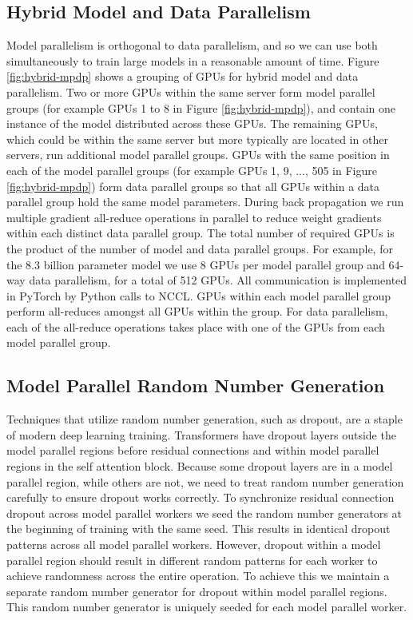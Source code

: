 \documentclass{article}
\begin{document}
\subsection{Hybrid Model and Data Parallelism}
Model parallelism is orthogonal to data parallelism, and so we can use both simultaneously to train large models in a reasonable amount of time. Figure \ref{fig:hybrid-mpdp} shows a grouping of GPUs for hybrid model and data parallelism. Two or more GPUs within the same server form model parallel groups (for example GPUs 1 to 8 in Figure \ref{fig:hybrid-mpdp}), and contain one instance of the model distributed across these GPUs.  The remaining GPUs, which could be within the same server but more typically are located in other servers, run additional model parallel groups. GPUs with the same position in each of the model parallel groups (for example GPUs 1, 9, ..., 505 in Figure \ref{fig:hybrid-mpdp}) form data parallel groups so that all GPUs within a data parallel group hold the same model parameters. During back propagation we run multiple gradient all-reduce operations in parallel to reduce weight gradients within each distinct data parallel group. The total number of required GPUs is the product of the number of model and data parallel groups. For example, for the 8.3 billion parameter model we use 8 GPUs per model parallel group and 64-way data parallelism, for a total of 512 GPUs.  All communication is implemented in PyTorch by Python calls to NCCL.  GPUs within each model parallel group perform all-reduces amongst all GPUs within the group.  For data parallelism, each of the all-reduce operations takes place with one of the GPUs from each model parallel group.

\subsection{Model Parallel Random Number Generation}
Techniques that utilize random number generation, such as dropout, are a staple of modern deep learning training. Transformers have dropout layers outside the model parallel regions before residual connections and within model parallel regions in the self attention block. Because some dropout layers are in a model parallel region, while others are not, we need to treat random number generation carefully to ensure dropout works correctly. To synchronize residual connection dropout across model parallel workers we seed the random number generators at the beginning of training with the same seed. This results in identical dropout patterns across all model parallel workers. However, dropout within a model parallel region should result in different random patterns for each worker to achieve randomness across the entire operation. To achieve this we maintain a separate random number generator for dropout within model parallel regions. This random number generator is uniquely seeded for each model parallel worker.
\end{document}
